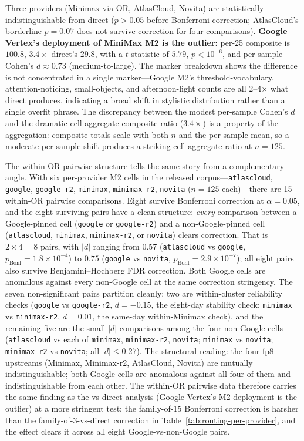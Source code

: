 \documentclass[11pt,a4paper]{article}
\begin{document}
Three providers (Minimax via OR, AtlasCloud, Novita) are statistically indistinguishable from direct ($p > 0.05$ before Bonferroni correction; AtlasCloud's borderline $p{=}0.07$ does not survive correction for four comparisons). \textbf{Google Vertex's deployment of MiniMax M2 is the outlier:} per-25 composite is $100.8$, $3.4\times$ direct's $29.8$, with a $t$-statistic of $5.79$, $p < 10^{-6}$, and per-sample Cohen's $d \approx 0.73$ (medium-to-large). The marker breakdown shows the difference is not concentrated in a single marker---Google M2's threshold-vocabulary, attention-noticing, small-objects, and afternoon-light counts are all 2--4$\times$ what direct produces, indicating a broad shift in stylistic distribution rather than a single overfit phrase. The discrepancy between the modest per-sample Cohen's $d$ and the dramatic cell-aggregate composite ratio ($3.4\times$) is a property of the aggregation: composite totals scale with both $n$ and the per-sample mean, so a moderate per-sample shift produces a striking cell-aggregate ratio at $n{=}125$.

The within-OR pairwise structure tells the same story from a complementary angle. With six per-provider M2 cells in the released corpus---\texttt{atlascloud}, \texttt{google}, \texttt{google-r2}, \texttt{minimax}, \texttt{minimax-r2}, \texttt{novita} ($n{=}125$ each)---there are 15 within-OR pairwise comparisons. Eight survive Bonferroni correction at $\alpha{=}0.05$, and the eight surviving pairs have a clean structure: \emph{every} comparison between a Google-pinned cell (\texttt{google} or \texttt{google-r2}) and a non-Google-pinned cell (\texttt{atlascloud}, \texttt{minimax}, \texttt{minimax-r2}, or \texttt{novita}) clears correction. That is $2 \times 4 = 8$ pairs, with $|d|$ ranging from $0.57$ (\texttt{atlascloud} vs \texttt{google}, $p_\text{Bonf}{=}1.8{\times}10^{-4}$) to $0.75$ (\texttt{google} vs \texttt{novita}, $p_\text{Bonf}{=}2.9{\times}10^{-7}$); all eight pairs also survive Benjamini--Hochberg FDR correction. Both Google cells are anomalous against every non-Google cell at the same correction stringency. The seven non-significant pairs partition cleanly: two are within-cluster reliability checks (\texttt{google} vs \texttt{google-r2}, $d{=}-0.15$, the eight-day stability check; \texttt{minimax} vs \texttt{minimax-r2}, $d{=}0.01$, the same-day within-Minimax check), and the remaining five are the small-$|d|$ comparisons among the four non-Google cells (\texttt{atlascloud} vs each of \texttt{minimax}, \texttt{minimax-r2}, \texttt{novita}; \texttt{minimax} vs \texttt{novita}; \texttt{minimax-r2} vs \texttt{novita}; all $|d| \leq 0.27$). The structural reading: the four fp8 upstreams (Minimax, Minimax-r2, AtlasCloud, Novita) are mutually indistinguishable; both Google cells are anomalous against all four of them and indistinguishable from each other. The within-OR pairwise data therefore carries the same finding as the vs-direct analysis (Google Vertex's M2 deployment is the outlier) at a more stringent test: the family-of-15 Bonferroni correction is harsher than the family-of-3-vs-direct correction in Table~\ref{tab:routing-per-provider}, and the effect clears it across all eight Google-vs-non-Google pairs.
\end{document}

